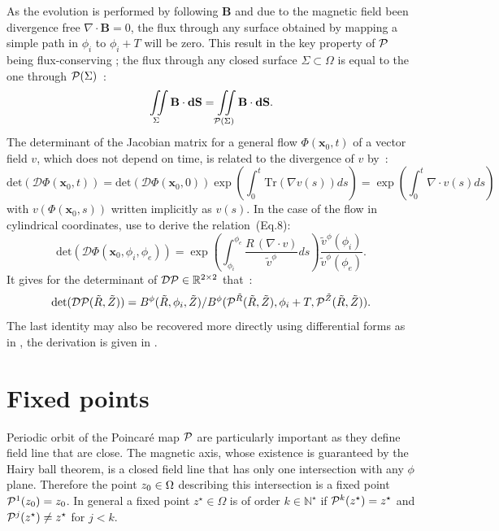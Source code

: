As the evolution is performed by following $\mathbf{B}$ and due to the magnetic field been divergence free $\nabla\cdot\textbf{B} = 0$, the flux through any surface obtained by mapping a simple path in $\phi_i$ to $\phi_i + T$ will be zero. This result in the key property of $\mathcal{P}$ being flux-conserving ; the flux through any closed surface $\Sigma \subset \Omega$ is equal to the one through $\mathcal{P}(\Sigma)$~:
\begin{equation*}
    \iint\limits_{\Sigma}\textbf{B}\cdot\textbf{dS} = \iint\limits_{\mathcal{P}(\Sigma)}\textbf{B}\cdot\textbf{dS}.
\end{equation*}
The determinant of the Jacobian matrix for a general flow $\Phi(\textbf{x}_0, t)$ of a vector field $v$, which does not depend on time, is related to the divergence of $v$ \cite[p.408]{hirsch_differential_2013} by~:
\begin{equation}\label{eq:det-div-flow}
    \text{det}(\mathcal{D}\Phi(\textbf{x}_0, t)) = \text{det}(\mathcal{D}\Phi(\textbf{x}_0, 0))\exp\left(\int_0^t\text{Tr}(\nabla v(s)) ds\right) = \exp\left(\int_0^t \nabla\cdot v(s) ds\right)
\end{equation}
with $v(\Phi(\textbf{x}_0, s))$ written implicitly as $v(s)$. In the case of the flow in cylindrical coordinates, \citeauthor{wei_invariant_2023} use  to derive the relation~(Eq.8):
\begin{equation*}\label{eq:det-div-pmap}
    \text{det}(\mathcal{D}\Phi(\textbf{x}_0, \phi_i, \phi_e)) = \exp\left(\int_{\phi_i}^{\phi_e} \frac{R\,(\nabla\cdot v)}{\tilde{v}^\phi} ds\right)\frac{\tilde{v}^\phi(\phi_i)}{\tilde{v}^\phi(\phi_e)}.
\end{equation*}
It gives for the determinant of $\mathcal{D}\mathcal{P} \in \mathbb{R}^{2\times2}$ that~:
\begin{equation}\label{eq:pmap-det}
    \text{det}(\mathcal{D}\mathcal{P}(\tilde{R}, \tilde{Z})) = B^\phi(\tilde{R},\phi_i, \tilde{Z})/B^\phi(\mathcal{P}^{\tilde{R}}(\tilde{R},\tilde{Z}), \phi_i+T,\mathcal{P}^{\tilde{Z}}(\tilde{R},\tilde{Z})).
\end{equation}
The last identity may also be recovered more directly using differential forms as in \cite{meiss_thirty_2015}, the derivation is given in .

\section{Fixed points}
Periodic orbit of the Poincaré map $\mathcal{P}$ are particularly important as they define field line that are close. The magnetic axis, whose existence is guaranteed by the Hairy ball theorem, is a closed field line that has only one intersection with any $\phi$ plane. Therefore the point $z_0\in\Omega$ describing this intersection is a fixed point $\mathcal{P}^1(z_0) = z_0$. In general a fixed point $z^\star\in\Omega$ is of order $k\in\mathbb{N}^\star$ if $\mathcal{P}^k(z^\star) = z^\star$ and $\mathcal{P}^j(z^\star) \neq z^\star$ for $j < k$.

